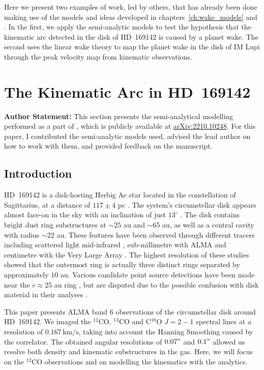 
Here we present two examples of work, led by others, that has already been done making use of the models and ideas developed in chapters~\ref{ch:wake_models} and \citep{calcino2022}.
In the first, we apply the semi-analytic models to test the hypothesis that the kinematic arc detected in the disk of  HD~169142 is caused by a planet wake.
The second uses the linear wake theory to map the planet wake in the disk of IM Lupi through the peak velocity map from kinematic observations.

\section{The Kinematic Arc in HD~169142} \label{sec:hd169}

\textbf{Author Statement:} This section presents the semi-analytical modelling performed as a part of \citet{garg2022}, which is publicly available at \href{https://arxiv.org/abs/2207.02869}{\url{arXiv:2210.10248}}.
For this paper, I contributed the semi-analytic models used, advised the lead author on how to work with them, and provided feedback on the manuscript.

\subsection{Introduction}

HD~169142 is a disk-hosting Herbig Ae star located in the constellation of Sagittarius, at a distance of $117 \pm 4$ pc \citep{brown2016}.
The system's circumstellar disk appears almost face-on in the sky with an inclination of just $13^\circ$ \citep{raman2006,panic2008}.
The disk contains bright dust ring substructures at $\sim25$ au and $\sim65$ au, as well as a central cavity with radius $\sim22$ au.
These features have been observed through different tracers including scattered light \citep{quanz2013a,momose2015,pohl2017,bertrang2018} mid-infrared \citep{honda2012}, sub-millimetre with ALMA \citep{fedele2017,macias2019,perez2019} and centimetre with the Very Large Array \citep{osorio2014}.
The highest resolution of these studies showed that the outermost ring is actually three distinct rings separated by approximately $10$ au.
Various candidate point source detections have been made near the $r \approx 25$ au ring \citep{biller2014,reggiani2014,gratton2019}, but are disputed due to the possible confusion with disk material in their analyses \citep{ligi2018}.

This paper presents ALMA band 6 observations of the circumstellar disk around HD~169142.
We imaged the $^{12}$CO, $^{13}$CO and C$^{18}$O $J=2-1$ spectral lines at a resolution of $0.167 \, \mathrm{km/s}$, taking into account the Hanning Smoothing caused by the correlator.
The obtained angular resolutions of $0.07"$ and $0.1"$ allowed us resolve both density and kinematic substructures in the gas. Here, we will focus on the $^{12}$CO observations and on modelling the kinematics with the analytics.

